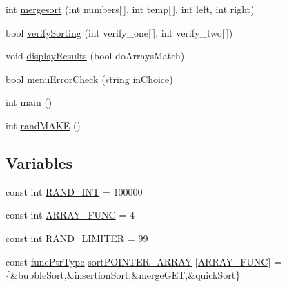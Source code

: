 \begin{DoxyCompactItemize}
\item 
int \hyperlink{_delouth_mansfield-_assn4-_sort_prog_8cpp_a5f5d9f539f726c766f4c454c579f2f6d}{mergesort} (int numbers\mbox{[}$\,$\mbox{]}, int temp\mbox{[}$\,$\mbox{]}, int left, int right)
\item 
bool \hyperlink{_delouth_mansfield-_assn4-_sort_prog_8cpp_ae2cf0cca1e089e83ae98750b96b8cf11}{verifySorting} (int verify\_\-one\mbox{[}$\,$\mbox{]}, int verify\_\-two\mbox{[}$\,$\mbox{]})
\item 
void \hyperlink{_delouth_mansfield-_assn4-_sort_prog_8cpp_a6832ddb090d7bf6c3b962acac96e3951}{displayResults} (bool doArraysMatch)
\item 
bool \hyperlink{_delouth_mansfield-_assn4-_sort_prog_8cpp_a3fcd92b059e256a9f46866c6d1e2b1e4}{menuErrorCheck} (string inChoice)
\item 
int \hyperlink{_delouth_mansfield-_assn4-_sort_prog_8cpp_ae66f6b31b5ad750f1fe042a706a4e3d4}{main} ()
\item 
int \hyperlink{_delouth_mansfield-_assn4-_sort_prog_8cpp_a191743d28b671610e8d78df14b41ed9e}{randMAKE} ()
\end{DoxyCompactItemize}
\subsection*{Variables}
\begin{DoxyCompactItemize}
\item 
const int \hyperlink{_delouth_mansfield-_assn4-_sort_prog_8cpp_a134c2ba56ae9ba89c77a5c0dba9f2124}{RAND\_\-INT} = 100000
\item 
const int \hyperlink{_delouth_mansfield-_assn4-_sort_prog_8cpp_a3b95dd60d5c45f7cc3733769f3d54868}{ARRAY\_\-FUNC} = 4
\item 
const int \hyperlink{_delouth_mansfield-_assn4-_sort_prog_8cpp_ad454298170f7805366a1aa2da04df23a}{RAND\_\-LIMITER} = 99
\item 
const \hyperlink{_delouth_mansfield-_assn4-_sort_prog_8cpp_ae2987d0004dea58df8c833858c0fb370}{funcPtrType} \hyperlink{_delouth_mansfield-_assn4-_sort_prog_8cpp_ae039780346621e190c7726c08c9a1a13}{sortPOINTER\_\-ARRAY} \mbox{[}\hyperlink{_delouth_mansfield-_assn4-_sort_prog_8cpp_a3b95dd60d5c45f7cc3733769f3d54868}{ARRAY\_\-FUNC}\mbox{]} = \{\&bubbleSort,\&insertionSort,\&mergeGET,\&quickSort\}
\end{DoxyCompactItemize}


